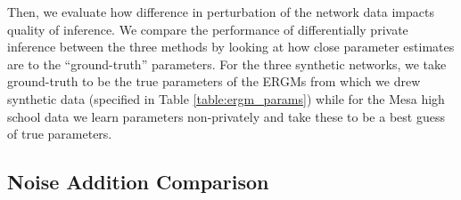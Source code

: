 Then, we evaluate how difference in perturbation of the network data impacts quality of inference. We compare the performance of differentially private inference between the three methods by looking at how close parameter estimates are to the ``ground-truth'' parameters. For the three synthetic networks, we take ground-truth to be the true parameters of the ERGMs from which we drew synthetic data (specified in Table \ref{table:ergm_params}) while for the Mesa high school data we learn parameters non-privately and take these to be a best guess of true parameters.   
 
 \subsection{Noise Addition Comparison}
 
